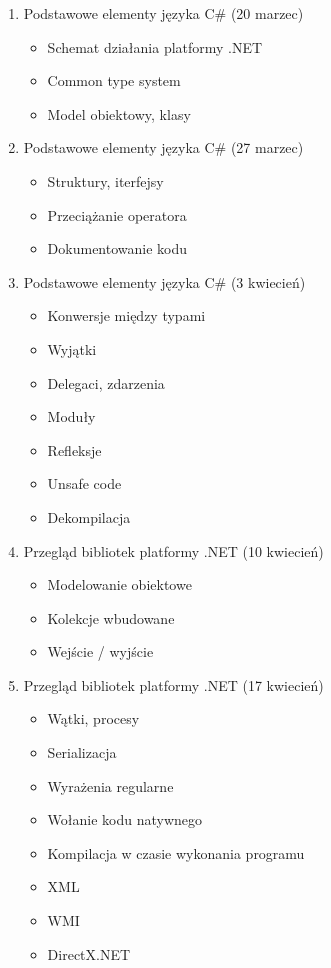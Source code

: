 \begin{enumerate}
\item Podstawowe elementy języka C\# (20 marzec)
	\begin{itemize}
	\item Schemat działania platformy .NET
	\item Common type system
	\item Model obiektowy, klasy 
	\end{itemize}
\item Podstawowe elementy języka C\# (27 marzec)
	\begin{itemize}
	\item Struktury, iterfejsy
	\item Przeciążanie operatora
	\item Dokumentowanie kodu	
	\end{itemize}
\item Podstawowe elementy języka C\# (3 kwiecień)
	\begin{itemize}
	\item Konwersje między typami
	\item Wyjątki
	\item Delegaci, zdarzenia
	\item Moduły 
	\item Refleksje
	\item Unsafe code
	\item Dekompilacja
	\end{itemize}

\item Przegląd bibliotek platformy .NET (10 kwiecień)
	\begin{itemize}
	\item Modelowanie obiektowe
	\item Kolekcje wbudowane
	\item Wejście / wyjście
	\end{itemize}
\item Przegląd bibliotek platformy .NET (17 kwiecień)
	\begin{itemize}
	\item Wątki, procesy
	\item Serializacja
	\item Wyrażenia regularne
	\item Wołanie kodu natywnego
	\item Kompilacja w czasie wykonania programu 
	\item XML
	\item WMI
	\item DirectX.NET
	\end{itemize}
	

\end{enumerate}
